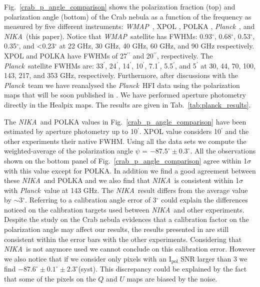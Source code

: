 \documentclass[twocolumn,traditabstract]{aa}
\def\NIKA{\textit{NIKA}}
\def\Planck{\textit{Planck}}
\def\WMAP{\textit{WMAP}}
\begin{document}
Fig.~\ref{crab_p_angle_comparison} shows the polarization fraction (top) and polarization angle (bottom) of the Crab nebula as a function of the frequency as measured by
five different instruments: 
\WMAP\ \citep{2011ApJS..192...19W}, XPOL \citep{aumont2010}, POLKA \citep{2014PASP..126.1027W}, \Planck\ \citep{2015arXiv150702058P}, and \NIKA\ (this paper). 
Notice that \WMAP\ satellite has FWHMs: 0.93$^{\circ}$, 0.68$^{\circ}$, 0.53$^{\circ}$, 0.35$^{\circ}$, and \textless 0.23$^{\circ}$ at 22 GHz, 30 GHz, 40 GHz, 60 GHz, and 90 GHz respectively. XPOL and POLKA have FWHMs of 27$^{\prime\prime}$ and 20$^{\prime\prime}$, respectively.
The \Planck\ satellite FWHMs are: 33$^{\prime}$, 24$^{\prime}$, 14$^{\prime}$, 10$^{\prime}$, 7.1$^{\prime}$, 5.5$^{\prime}$, and 5$^{\prime}$ at 30, 44, 70, 100, 143, 217, and 353 GHz, respectively. Furthermore, after discussions with the \Planck\ team we have reanalysed the \Planck\ HFI data using the polarization maps that will be soon published in \cite{planck2018}. We have performed aperture photometry directly in the Healpix maps. The results are given in Tab.~\ref{tab:planck_results}.

The \NIKA\ and POLKA values in Fig.~\ref{crab_p_angle_comparison} have been estimated by aperture photometry up to 10$^{\prime}$. XPOL value considers 10$^{\prime}$ \citep{aumont2010} and the other experiments their native FWHM.
Using all the data sets we compute the weighted-average of the polarization angle $\psi$ = $-87.5^{\circ}\pm 0.3^{\circ}$.  
All the observations shown on the bottom panel of
Fig.~\ref{crab_p_angle_comparison} agree within 1$\sigma$ with this value except for POLKA.
In addition we find a good agreement between these \NIKA\ and POLKA and we also find that \NIKA\ is consistent within 1$\sigma$ with \Planck\ value at 143 GHz.
The \NIKA\ result differs from the average value by $\sim$3$^{\circ}$. 
Referring to \cite{ritacco2017} a calibration angle error of 3$^{\circ}$ could explain the differences noticed on the calibration targets used between \NIKA\ and other experiments. Despite the study on the Crab nebula evidences that a calibration factor on the polarization angle may affect our results, the results presented in \cite{ritacco2017} are still consistent within the error bars with the other experiments. Considering that \NIKA\ is not anymore used we cannot conclude on this calibration error.
However we also notice that if we consider only pixels with an $\textrm{I}_\textrm{pol}$ SNR larger than 3 we find $-87.6^{\circ} \pm 0.1^{\circ} \pm 2.3^{\circ}$(syst). This discrepancy could be explained by the fact that some of the pixels on the $Q$ and $U$ maps are biased by the noise.
  
\end{document}
